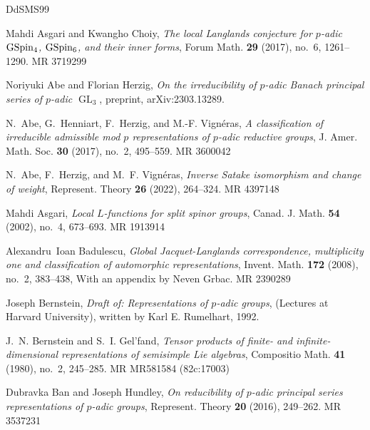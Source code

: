 \documentclass[a4paper]{amsart}
\numberwithin{equation}{section}
\theoremstyle{remark}
\theoremstyle{definition}
\DeclareMathOperator{\GL}{GL}
\begin{document}
\newcommand{\etalchar}[1]{$^{#1}$}
\providecommand{\bysame}{\leavevmode\hbox to3em{\hrulefill}\thinspace}
\providecommand{\MR}{\relax\ifhmode\unskip\space\fi MR }
\providecommand{\MRhref}[2]{%
  \href{http://www.ams.org/mathscinet-getitem?mr=#1}{#2}
}
\providecommand{\href}[2]{#2}
\begin{thebibliography}{DdSMS99}

Mahdi Asgari and Kwangho Choiy, \emph{The local {L}anglands conjecture for
  {$p$}-adic {$\rm GSpin_4$}, {$\rm GSpin_6$}, and their inner forms}, Forum
  Math. \textbf{29} (2017), no.~6, 1261--1290. \MR{3719299}

Noriyuki Abe and Florian Herzig, \emph{On the irreducibility of {$p$}-adic
  {B}anach principal series of $p$-adic {$\GL_3$}}, preprint, arXiv:2303.13289.

N.~Abe, G.~Henniart, F.~Herzig, and M.-F. Vign\'eras, \emph{A classification of
  irreducible admissible mod {$p$} representations of {$p$}-adic reductive
  groups}, J. Amer. Math. Soc. \textbf{30} (2017), no.~2, 495--559.
  \MR{3600042}

N.~Abe, F.~Herzig, and M.~F. Vign\'{e}ras, \emph{Inverse {S}atake isomorphism
  and change of weight}, Represent. Theory \textbf{26} (2022), 264--324.
  \MR{4397148}

Mahdi Asgari, \emph{Local {$L$}-functions for split spinor groups}, Canad. J.
  Math. \textbf{54} (2002), no.~4, 673--693. \MR{1913914}

Alexandru~Ioan Badulescu, \emph{Global {J}acquet-{L}anglands correspondence,
  multiplicity one and classification of automorphic representations}, Invent.
  Math. \textbf{172} (2008), no.~2, 383--438, With an appendix by Neven Grbac.
  \MR{2390289}

Joseph Bernstein, \emph{Draft of: Representations of {$p$}-adic groups},
  (Lectures at Harvard University), written by Karl E. Rumelhart, 1992.

J.~N. Bernstein and S.~I. Gel'fand, \emph{Tensor products of finite- and
  infinite-dimensional representations of semisimple {L}ie algebras},
  Compositio Math. \textbf{41} (1980), no.~2, 245--285. \MR{MR581584
  (82c:17003)}

Dubravka Ban and Joseph Hundley, \emph{On reducibility of {$p$}-adic principal
  series representations of {$p$}-adic groups}, Represent. Theory \textbf{20}
  (2016), 249--262. \MR{3537231}


\end{thebibliography}
\end{document}
